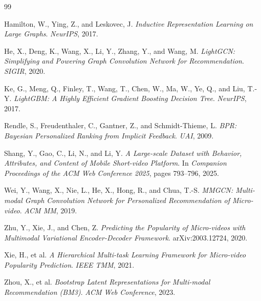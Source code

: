 \documentclass[12pt, a4paper]{article}
\begin{document}

\begin{thebibliography}{99}

Hamilton, W., Ying, Z., and Leskovec, J.
\newblock \emph{Inductive Representation Learning on Large Graphs}.
\newblock \textit{NeurIPS}, 2017.

He, X., Deng, K., Wang, X., Li, Y., Zhang, Y., and Wang, M.
\newblock \emph{LightGCN: Simplifying and Powering Graph Convolution Network for Recommendation}.
\newblock \textit{SIGIR}, 2020.

Ke, G., Meng, Q., Finley, T., Wang, T., Chen, W., Ma, W., Ye, Q., and Liu, T.-Y.
\newblock \emph{LightGBM: A Highly Efficient Gradient Boosting Decision Tree}.
\newblock \textit{NeurIPS}, 2017.

Rendle, S., Freudenthaler, C., Gantner, Z., and Schmidt-Thieme, L.
\newblock \emph{BPR: Bayesian Personalized Ranking from Implicit Feedback}.
\newblock \textit{UAI}, 2009.

Shang, Y., Gao, C., Li, N., and Li, Y.
\newblock \emph{A Large-scale Dataset with Behavior, Attributes, and Content
  of Mobile Short-video Platform}.
\newblock In \textit{Companion Proceedings of the ACM Web Conference 2025},
  pages 793--796, 2025.

Wei, Y., Wang, X., Nie, L., He, X., Hong, R., and Chua, T.-S.
\newblock \emph{MMGCN: Multi-modal Graph Convolution Network for Personalized
  Recommendation of Micro-video}.
\newblock \textit{ACM MM}, 2019.

Zhu, Y., Xie, J., and Chen, Z.
\newblock \emph{Predicting the Popularity of Micro-videos with Multimodal
  Variational Encoder-Decoder Framework}.
\newblock arXiv:2003.12724, 2020.

Xie, H., et al.
\newblock \emph{A Hierarchical Multi-task Learning Framework for Micro-video
  Popularity Prediction}.
\newblock \textit{IEEE TMM}, 2021.

Zhou, X., et al.
\newblock \emph{Bootstrap Latent Representations for Multi-modal Recommendation (BM3)}.
\newblock \textit{ACM Web Conference}, 2023.

\end{thebibliography}
\end{document}
